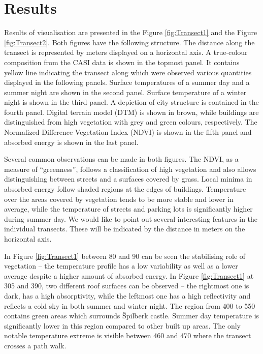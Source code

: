 \section{Results}

Results of visualisation are presented in the Figure \ref{fig:Transect1} and the Figure \ref{fig:Transect2}. Both figures have the following structure. The distance along the transect is represented by meters displayed on a horizontal axis. A true-colour composition from the CASI data is shown in the topmost panel. It contains yellow line indicating the transect along which were observed various quantities displayed in the following panels. Surface temperatures of a summer day and a summer night are shown in the second panel. Surface temperature of a winter night is shown in the third panel. A depiction of city structure is contained in the fourth panel. Digital terrain model (DTM) is shown in brown, while buildings are distinguished from high vegetation with grey and green colours, respectively. The Normalized Difference Vegetation Index (NDVI) is shown in the fifth panel and absorbed energy is shown in the last panel.

Several common observations can be made in both figures. The NDVI, as a measure of ``greenness'', follows a classification of high vegetation and also allows distinguishing between streets and a surfaces covered by grass. Local minima in absorbed energy follow shaded regions at the edges of buildings. Temperature over the areas covered by vegetation tends to be more stable and lower in average, while the temperature of streets and parking lots is significantly higher during summer day. We would like to point out several interesting features in the individual transects. These will be indicated by the distance in meters on the horizontal axis.

In Figure \ref{fig:Transect1} between 80 and 90 can be seen the stabilising role of vegetation – the temperature profile has a low variability as well as a lower average despite a higher amount of absorbed energy. In Figure \ref{fig:Transect1} at 305 and 390, two different roof surfaces can be observed – the rightmost one is dark, has a high absorptivity, while the leftmost one has a high reflectivity and reflects a cold sky in both summer and winter night. The region from 400 to 550 contains green areas which surrounds Špilberk castle. Summer day temperature is significantly lower in this region compared to other built up areas. The only notable temperature extreme is visible between 460 and 470 where the transect crosses a path walk.

